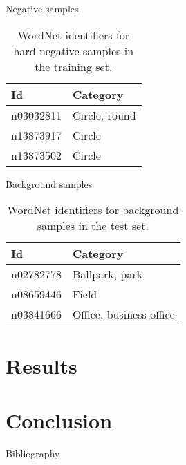 \documentclass{beamer}
\begin{document}
\begin{frame}{Negative samples}
	\begin{table}[H]
		\centering
		\caption{WordNet identifiers for hard negative samples in the training set.}
		\label{tab:negtraining}
		\begin{tabularx}{\textwidth}{lX}
			\toprule
			\textbf{Id} & \textbf{Category} \\
			\midrule
				n03032811 & Circle, round \\
				n13873917 & Circle \\
				n13873502 & Circle \\
			\bottomrule
		\end{tabularx}
	\end{table}
\end{frame}

\begin{frame}{Background samples}
	\begin{table}[H]
		\centering
		\caption{WordNet identifiers for background samples in the test set.}
		\label{tab:baktraining}
		\begin{tabularx}{\textwidth}{lX}
			\toprule
			\textbf{Id} & \textbf{Category} \\
			\midrule
				n02782778 & Ballpark, park \\
				n08659446 & Field \\
				n03841666 & Office, business office \\
			\bottomrule
		\end{tabularx}
	\end{table}
\end{frame}


\section{Results}


\section{Conclusion}





	\begin{frame}{Bibliography}
		
		
	\end{frame}
\end{document}
